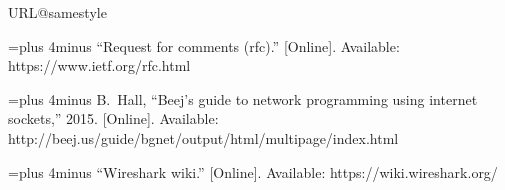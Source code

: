 \documentclass[11pt,a4paper,reqno]{report}
\numberwithin{equation}{section}
\begin{document}
\begin{thebibliography}{1}
	
\providecommand{\URL}[1]{#1}
\csname URL@samestyle\endcsname
\providecommand{\newblock}{\relax}
\providecommand{\bibinfo}[2]{#2}
\providecommand{\BIBentrySTDinterwordspacing}{\spaceskip=0pt\relax}
\providecommand{\BIBentryALTinterwordstretchfactor}{4}
\providecommand{\BIBentryALTinterwordspacing}{\spaceskip=\fontdimen2\font plus
\BIBentryALTinterwordstretchfactor\fontdimen3\font minus
  \fontdimen4\font\relax}
\providecommand{\BIBforeignlanguage}[2]{{%
\expandafter\ifx\csname l@#1\endcsname\relax
\typeout{** WARNING: IEEEtran.bst: No hyphenation pattern has been}%
\typeout{** loaded for the language `#1'. Using the pattern for}%
\typeout{** the default language instead.}%
\else
\language=\csname l@#1\endcsname
\fi
#2}}
\providecommand{\BIBdecl}{\relax}
\BIBdecl

\BIBentryALTinterwordspacing
``Request for comments (rfc).'' [Online]. Available:
  \URL{https://www.ietf.org/rfc.html}
\BIBentrySTDinterwordspacing

\BIBentryALTinterwordspacing
B.~Hall, ``Beej's guide to network programming using internet sockets,'' 2015.
  [Online]. Available:
  \URL{http://beej.us/guide/bgnet/output/html/multipage/index.html}
\BIBentrySTDinterwordspacing

\BIBentryALTinterwordspacing
``Wireshark wiki.'' [Online]. Available: \URL{https://wiki.wireshark.org/}
\BIBentrySTDinterwordspacing

\end{thebibliography}
\end{document}
